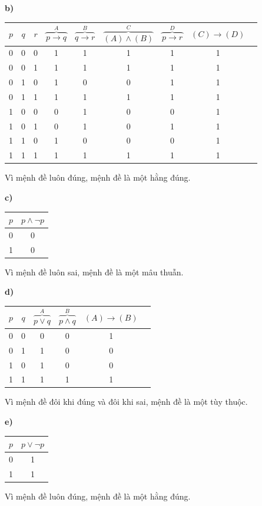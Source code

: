 \documentclass[12pt,a4paper]{article}
\theoremstyle{definition}
\begin{document}
\medskip
\textbf{b)}
\begin{center}
\begin{tabular}{ccc|cccccc}
$p$ & $q$ & $r$ & $\overbrace{p \to q}^{A}$ & $\overbrace{q \to r}^{B}$ & $\overbrace{(A) \land (B)}^{C}$ & $\overbrace{p \to r}^{D}$ & $(C) \to (D)$ \\
\hline
0 & 0 & 0 & 1 & 1 & 1 & 1 & 1 \\
0 & 0 & 1 & 1 & 1 & 1 & 1 & 1 \\
0 & 1 & 0 & 1 & 0 & 0 & 1 & 1 \\
0 & 1 & 1 & 1 & 1 & 1 & 1 & 1 \\
1 & 0 & 0 & 0 & 1 & 0 & 0 & 1 \\
1 & 0 & 1 & 0 & 1 & 0 & 1 & 1 \\
1 & 1 & 0 & 1 & 0 & 0 & 0 & 1 \\
1 & 1 & 1 & 1 & 1 & 1 & 1 & 1
\end{tabular}
\end{center}
Vì mệnh đề luôn đúng, mệnh đề là một hằng đúng.

\medskip
\textbf{c)}
\begin{center}
\begin{tabular}{c|c}
$p$ & $p \land \neg p$ \\
\hline
0 & 0 \\
1 & 0
\end{tabular}
\end{center}
Vì mệnh đề luôn sai, mệnh đề là một mâu thuẫn.

\medskip
\textbf{d)}
\begin{center}
\begin{tabular}{cc|cccc}
$p$ & $q$ & $\overbrace{p \lor q}^{A}$ & $\overbrace{p \land q}^{B}$ & $(A) \to (B)$ \\
\hline
0 & 0 & 0 & 0 & 1 \\
0 & 1 & 1 & 0 & 0 \\
1 & 0 & 1 & 0 & 0 \\
1 & 1 & 1 & 1 & 1
\end{tabular}
\end{center}
Vì mệnh đề đôi khi đúng và đôi khi sai, mệnh đề là một tùy thuộc.

\medskip
\textbf{e)}
\begin{center}
\begin{tabular}{c|c}
$p$ & $p \lor \neg p$ \\
\hline
0 & 1 \\
1 & 1
\end{tabular}
\end{center}
Vì mệnh đề luôn đúng, mệnh đề là một hằng đúng.
\end{document}
